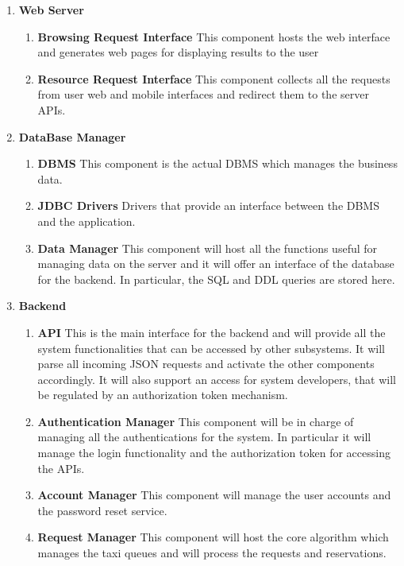 \documentclass[11pt, a4paper,titlepage]{article}
\begin{document}
\begin{enumerate}
\begin{enumerate}
 	 \end{enumerate}
 	\item \textbf{Web Server}
	 	\begin{enumerate}
	 		\item \label{itm:Component_BRI} \textbf{Browsing Request Interface} This component hosts the web interface and generates web pages for displaying results to the user
	 		\item \label{itm:Component_RRI} \textbf{Resource Request Interface} This component collects all the requests from user web and mobile interfaces and redirect them to the server APIs.
	 	\end{enumerate}
 	\item \textbf{DataBase Manager}
 		 	\begin{enumerate}
 		 		\item \label{itm:Component_DBMS} \textbf{DBMS} This component is the actual DBMS which manages the business data.
 		 		\item \label{itm:Component_JDBC} \textbf{JDBC Drivers} Drivers that provide an interface between the DBMS and the application.
 		 		\item \label{itm:Component_DataManager} \textbf{Data Manager} This component will host all the functions useful for managing data on the server and it will offer an interface of the database for the backend. In particular, the SQL and DDL queries are stored here.
 		 	\end{enumerate}
 	\item \textbf{Backend}
		 	\begin{enumerate}
		 		\item \label{itm:Component_API} \textbf{API} This is the main interface for the backend and will provide all the system functionalities that can be accessed by other subsystems. It will parse all incoming JSON requests and activate the other components accordingly. It will also support an access for system developers, that will be regulated by an authorization token mechanism.
		 		\item \label{itm:Component_AuthenticationManager} \textbf{Authentication Manager} This component will be in charge of managing all the authentications for the system. In particular it will manage the login functionality and the authorization token for accessing the APIs.
		 		\item \label{itm:Component_AccountManager} \textbf{Account Manager} This component will manage the user accounts and the password reset service.
		 		\item \label{itm:Component_RequestManager} \textbf{Request Manager} This component will host the core algorithm which manages the taxi queues and will process the requests and reservations.

\end{enumerate}
\end{enumerate}
\end{document}
